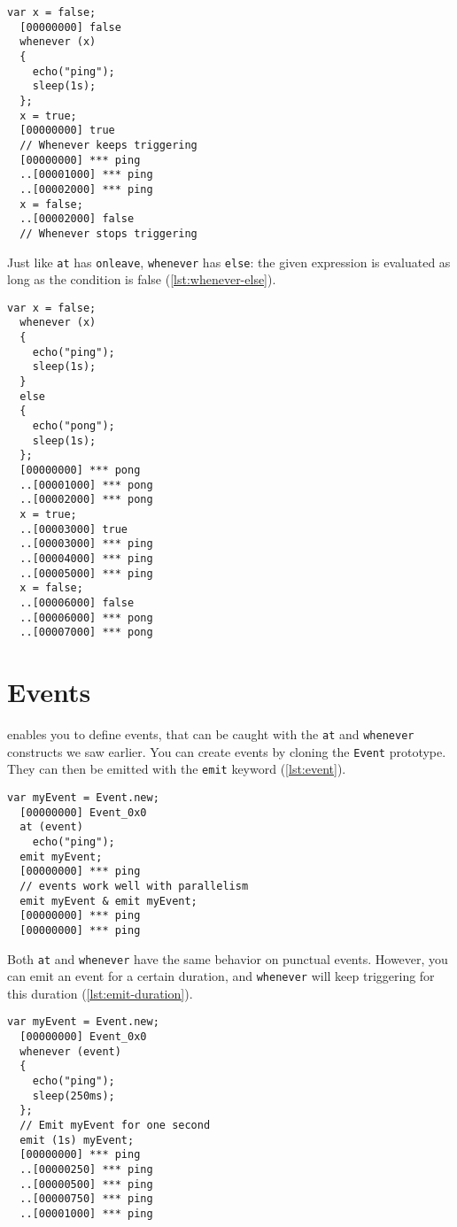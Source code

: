 \documentclass[openright,twoside,12pt]{report}
\newcommand{\lst}[1]{\autoref{lst:#1}}
\begin{document}
\begin{lstlisting}[caption=Using \texttt{whenever}, label=lst:whenever]
  var x = false;
  [00000000] false
  whenever (x)
  {
    echo("ping");
    sleep(1s);
  };
  x = true;
  [00000000] true
  // Whenever keeps triggering
  [00000000] *** ping
  ..[00001000] *** ping
  ..[00002000] *** ping
  x = false;
  ..[00002000] false
  // Whenever stops triggering
\end{lstlisting}

Just like \lstinline|at| has \lstinline|onleave|, \lstinline|whenever|
has \lstinline|else|: the given expression is evaluated as long as the
condition is false (\lst{whenever-else}).

\begin{lstlisting}[caption=Using \texttt{whenever ... else},
  label=lst:whenever-else]
  var x = false;
  whenever (x)
  {
    echo("ping");
    sleep(1s);
  }
  else
  {
    echo("pong");
    sleep(1s);
  };
  [00000000] *** pong
  ..[00001000] *** pong
  ..[00002000] *** pong
  x = true;
  ..[00003000] true
  ..[00003000] *** ping
  ..[00004000] *** ping
  ..[00005000] *** ping
  x = false;
  ..[00006000] false
  ..[00006000] *** pong
  ..[00007000] *** pong
\end{lstlisting}

\section{Events}

\urbi enables you to define events, that can be caught with the
\lstinline|at| and \lstinline|whenever| constructs we saw earlier. You
can create events by cloning the \lstinline|Event| prototype. They can
then be emitted with the \lstinline|emit| keyword (\lst{event}).

\begin{lstlisting}[caption=Using events, label=lst:event]
  var myEvent = Event.new;
  [00000000] Event_0x0
  at (event)
    echo("ping");
  emit myEvent;
  [00000000] *** ping
  // events work well with parallelism
  emit myEvent & emit myEvent;
  [00000000] *** ping
  [00000000] *** ping
\end{lstlisting}

Both \lstinline|at| and \lstinline|whenever| have the same behavior on
punctual events. However, you can emit an event for a certain
duration, and \lstinline|whenever| will keep triggering for this
duration (\lst{emit-duration}).

\begin{lstlisting}[caption=Emitting events with a duration,
  label=lst:emit-duration]
  var myEvent = Event.new;
  [00000000] Event_0x0
  whenever (event)
  {
    echo("ping");
    sleep(250ms);
  };
  // Emit myEvent for one second
  emit (1s) myEvent;
  [00000000] *** ping
  ..[00000250] *** ping
  ..[00000500] *** ping
  ..[00000750] *** ping
  ..[00001000] *** ping
\end{lstlisting}
\end{document}
